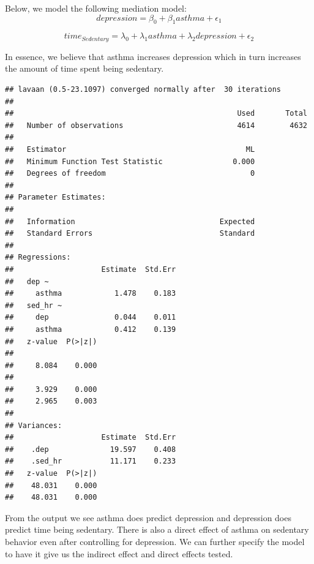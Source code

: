 \documentclass[]{tufte-book}
\newenvironment{Shaded}{}{}
\newcommand{\KeywordTok}[1]{\textcolor[rgb]{0.00,0.44,0.13}{\textbf{#1}}}
\newcommand{\DataTypeTok}[1]{\textcolor[rgb]{0.56,0.13,0.00}{#1}}
\newcommand{\DecValTok}[1]{\textcolor[rgb]{0.25,0.63,0.44}{#1}}
\newcommand{\StringTok}[1]{\textcolor[rgb]{0.25,0.44,0.63}{#1}}
\newcommand{\OperatorTok}[1]{\textcolor[rgb]{0.40,0.40,0.40}{#1}}
\newcommand{\NormalTok}[1]{#1}
\theoremstyle{definition}
\theoremstyle{definition}
\theoremstyle{remark}
\begin{document}
Below, we model the following mediation model: \[
depression = \beta_0 + \beta_1 asthma + \epsilon_1
\]

\[
time_{Sedentary} = \lambda_0 + \lambda_1 asthma + \lambda_2 depression + \epsilon_2
\]

In essence, we believe that asthma increases depression which in turn
increases the amount of time spent being sedentary.

\begin{Shaded}
\end{Shaded}

\begin{verbatim}
## lavaan (0.5-23.1097) converged normally after  30 iterations
## 
##                                                   Used       Total
##   Number of observations                          4614        4632
## 
##   Estimator                                         ML
##   Minimum Function Test Statistic                0.000
##   Degrees of freedom                                 0
## 
## Parameter Estimates:
## 
##   Information                                 Expected
##   Standard Errors                             Standard
## 
## Regressions:
##                    Estimate  Std.Err
##   dep ~                             
##     asthma            1.478    0.183
##   sed_hr ~                          
##     dep               0.044    0.011
##     asthma            0.412    0.139
##   z-value  P(>|z|)
##                   
##     8.084    0.000
##                   
##     3.929    0.000
##     2.965    0.003
## 
## Variances:
##                    Estimate  Std.Err
##    .dep              19.597    0.408
##    .sed_hr           11.171    0.233
##   z-value  P(>|z|)
##    48.031    0.000
##    48.031    0.000
\end{verbatim}

From the output we see asthma does predict depression and depression
does predict time being sedentary. There is also a direct effect of
asthma on sedentary behavior even after controlling for depression. We
can further specify the model to have it give us the indirect effect and
direct effects tested.
\end{document}
